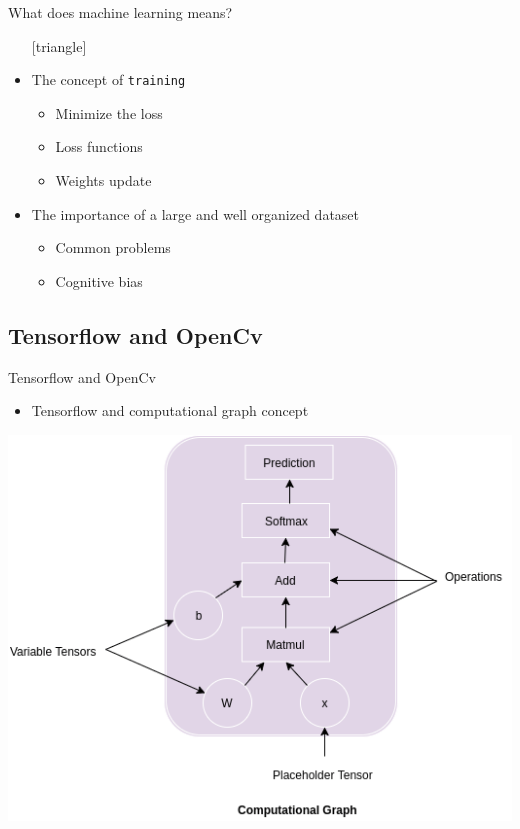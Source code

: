 \documentclass{beamer}
\begin{document}
\begin{frame}{What does machine learning means?}
	\begin{itemize}
		\setlength\itemsep{1em}
		[triangle]
  		\item 
			The concept of \texttt{training}
    			\begin{itemize}
				[circle]
    				\item
      					Minimize the loss
    				\item    
      					Loss functions
   				\item
					Weights update
			\end{itemize}
		\item
    			The importance of a large and well organized dataset
    			\begin{itemize}
				[circle]
   				\item 
					Common problems
    				\item 
					Cognitive bias
    			\end{itemize}
 	 \end{itemize}
\end{frame}

\subsection{Tensorflow and OpenCv}

\begin{frame}{Tensorflow and OpenCv}
	\begin{itemize}
		\setlength\itemsep{1em}
		[triangle]
		\item 
			Tensorflow and computational graph concept
	\end{itemize}
	\begin{center}
    		\includegraphics[scale=0.4]{comp}
	\end{center}
\end{frame}
\end{document}
